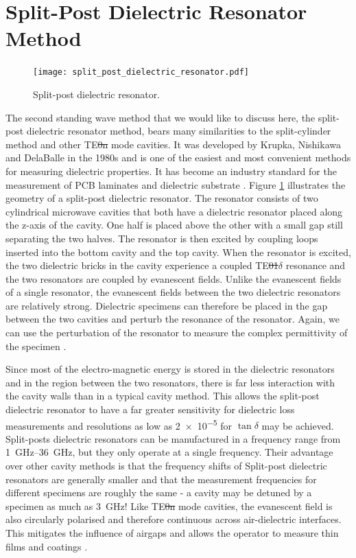 \section{Split-Post Dielectric Resonator Method}
\begin{figure}
\centering
\texttt{[image: split\_post\_dielectric\_resonator.pdf]}
\caption{Split-post dielectric resonator.}\label{fig:split_dr}
\end{figure}

The second standing wave method that we would like to discuss here, the split-post dielectric resonator method, bears many similarities to the split-cylinder method and other TE\st{0n} mode cavities. It was developed by Krupka, Nishikawa and DelaBalle \cite{dellaballe,nishikawa,krupka} in the 1980s and is one of the easiest and most convenient methods for measuring dielectric properties. It has become an industry standard for the measurement of PCB laminates and dielectric substrate \cite{iecSPDR}. Figure \ref{fig:split_dr} illustrates the geometry of a split-post dielectric resonator. The resonator consists of two cylindrical microwave cavities that both have a dielectric resonator placed along the z-axis of the cavity. One half is placed above the other with a small gap still separating the two halves. The resonator is then excited by coupling loops inserted into the bottom cavity and the top cavity. When the resonator is excited, the two dielectric bricks in the cavity experience a coupled TE\st{01$\delta$} resonance and the two resonators are coupled by evanescent fields. Unlike the evanescent fields of a single resonator, the evanescent fields between the two dielectric resonators are relatively strong. Dielectric specimens can therefore be placed in the gap between the two cavities and perturb the resonance of the resonator. Again, we can use the perturbation of the resonator to measure the complex permittivity of the specimen \cite{NPL, janezicSPDR, krupka}.

Since most of the electro-magnetic energy is stored in the dielectric resonators and in the region between the two resonators, there is far less interaction with the cavity walls than in a typical cavity method. This allows the split-post dielectric resonator to have a far greater sensitivity for dielectric loss measurements and resolutions as low as \num{2e-5} for $\tan\delta$ may be achieved. Split-posts dielectric resonators can be manufactured in a frequency range from \SIrange{1}{36}{\giga\hertz}, but they only operate at a single frequency. Their advantage over other cavity methods is that the frequency shifts of Split-post dielectric resonators are generally smaller and that the measurement frequencies for different specimens are roughly the same - a cavity may be detuned by a specimen as much as \SI{3}{\giga\hertz}! Like TE\st{0n} mode cavities, the evanescent field is also circularly polarised and therefore continuous across air-dielectric interfaces. This mitigates the influence of airgaps and allows the operator to measure thin films and coatings \cite{NPL, janezicSPDR, krupka}.

